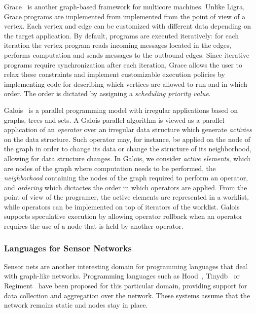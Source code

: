 Grace~\cite{wang:asynchronous} is another graph-based framework for multicore
machines. Unlike Ligra, Grace programs are implemented from implemented from the
point of view of a vertex. Each vertex and edge can be customized with different
data depending on the target application. By default, programs are executed
iteratively: for each iteration the vertex program reads incoming messages
located in the edges, performs computation and sends messages to the outbound
edges. Since iterative programs require synchronization after each iteration,
Grace allows the user to relax these constraints and implement customizable
execution policies by implementing code for describing which vertices are
allowed to run and in which order. The order is dictated by assigning a
\emph{scheduling priority value}.

Galois~\cite{Pingali:2011:TPA:1993316.1993501} is a parallel programming model
with irregular applications based on graphs, trees and sets. A Galois parallel
algorithm is viewed as a parallel application of an \emph{operator} over an
irregular data structure which generate \emph{activies} on the data structure.
Such operator may, for instance, be applied on the
node of the graph in order to change its data or change the structure of its
neighborhood, allowing for data structure changes. In Galois, we consider
\emph{active elements}, which are nodes of the graph where computation needs to
be performed, the \emph{neighborhood} containing the nodes of the graph required
to perform an operator, and \emph{ordering} which dictactes the order in which
operators are applied. From the point of view of the programer, the active
elements are represented in a worklist, while operators can be implemented on
top of iterators of the worklist. Galois supports speculative execution by
allowing operator rollback when an operator requires the use of a node that is
held by another operator.

\subsubsection{Languages for Sensor Networks}

Sensor nets are another interesting domain for programming languages that deal
with graph-like networks.  Programming languages such as
Hood~\cite{Whitehouse:2004:HNA:990064.990079},
Tinydb~\cite{Madden:2005:TAQ:1061318.1061322} or
Regiment~\cite{Newton:2007:RMS:1236360.1236422} have been proposed for this
particular domain, providing support for data collection and aggregation over
the network.  These systems assume that the network remains static and nodes
stay in place.

